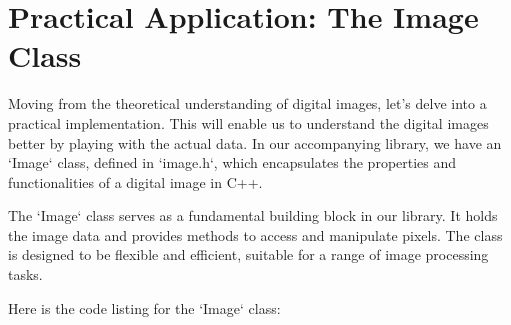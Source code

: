 \documentclass[11pt]{book}
\begin{document}
\section{Practical Application: The Image Class}


Moving from the theoretical understanding of digital images, let's delve into a practical implementation. This will enable us to understand the digital images better by playing with the actual data. In our accompanying library, we have an `Image` class, defined in `image.h`, which encapsulates the properties and functionalities of a digital image in C++. 

The `Image` class serves as a fundamental building block in our library. It holds the image data and provides methods to access and manipulate pixels. The class is designed to be flexible and efficient, suitable for a range of image processing tasks.

Here is the code listing for the `Image` class:
\end{document}
